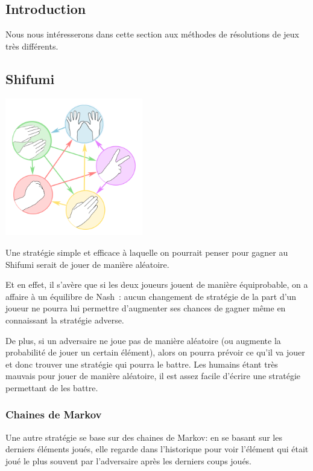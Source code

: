 \subsection{Introduction}
  Nous nous intéresserons dans cette section aux méthodes de résolutions de
  jeux très différents.

\subsection{Shifumi}
    \begin{center}\includegraphics[width=6cm]{shifumi.png}\end{center}

    Une stratégie simple et efficace à laquelle on pourrait penser pour gagner
    au Shifumi serait de jouer de manière aléatoire.

    Et en effet, il s'avère que si les deux joueurs jouent de manière équiprobable,
    on a affaire à un équilibre de Nash~: aucun changement de stratégie de la part
    d'un joueur ne pourra lui permettre d'augmenter ses chances de gagner même
    en connaissant la stratégie adverse.

    De plus, si un adversaire ne joue pas de manière aléatoire (ou augmente la
    probabilité de jouer un certain élément), alors on pourra prévoir ce qu'il
    va jouer et donc trouver une stratégie qui pourra le battre. Les humains
    étant très mauvais pour jouer de manière aléatoire, il est assez facile
    d'écrire une stratégie permettant de les battre.

  \subsubsection{Chaines de Markov}
    Une autre stratégie se base sur des chaines de Markov: en se basant sur les
    derniers éléments joués, elle regarde dans l'historique pour voir l'élément
    qui était joué le plus souvent par l'adversaire après les derniers coups
    joués.

